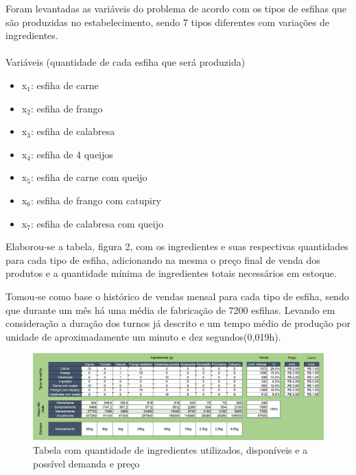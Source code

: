 \documentclass[
	12pt,				%
	openright,			%
	oneside,			%
	a4paper,			%
	english,			%
	french,				%
	spanish,			%
	brazil				%
	]{abntex2}
\begin{document}
	Foram levantadas as variáveis do problema de acordo com os tipos de esfihas que são produzidas no estabelecimento, sendo 7 tipos diferentes com variações de ingredientes.\\
\\
Variáveis (quantidade de cada esfiha que será produzida)
\begin{itemize}

\item x$_1$: esfiha de carne
\item x$_2$: esfiha de frango
\item x$_3$: esfiha de calabresa
\item x$_4$: esfiha de 4 queijos
\item x$_5$: esfiha de carne com queijo
\item x$_6$: esfiha de frango com catupiry
\item x$_7$: esfiha de calabresa com queijo

\end{itemize}

	Elaborou-se a tabela, figura 2, com os ingredientes e suas respectivas quantidades para cada tipo de esfiha, adicionando na mesma o preço final de venda dos produtos e a quantidade mínima de ingredientes totais necessários em estoque.

	Tomou-se como base o histórico de vendas mensal para cada tipo de esfiha, sendo que durante um mês há uma média de fabricação de 7200 esfihas. Levando em consideração a duração dos turnos já descrito e um tempo médio de produção por unidade de aproximadamente um minuto e dez segundos(0,019h).

\begin{figure}[H] \centering \label{figura2}
\caption{Tabela com quantidade de ingredientes utilizados, disponíveis e a possível demanda e preço}
\includegraphics[scale=0.46]{imagens_suporte/iamgem.png}
\end{figure}
 
\end{document}
